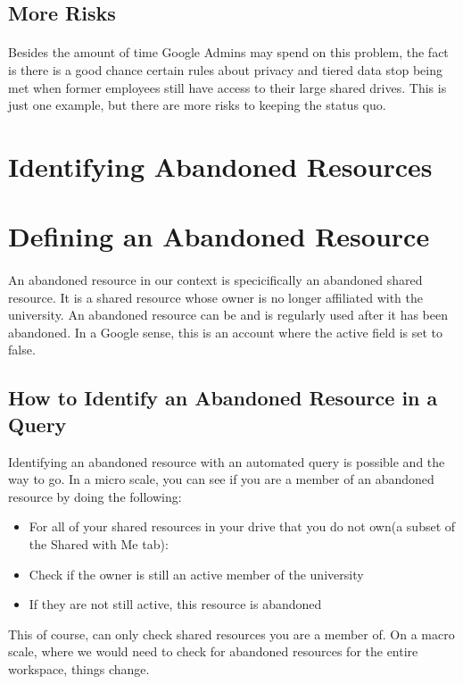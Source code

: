 \documentclass{article}
\begin{document}
\subsection*{More Risks}
\paragraph*{} Besides the amount of time Google Admins may spend on this problem, the fact is there is a good chance certain rules about privacy and tiered data stop being met when former employees still have access to their large shared drives.
This is just one example, but there are more risks to keeping the status quo.

\newpage
\section{Identifying Abandoned Resources}
\section*{Defining an Abandoned Resource}
\paragraph*{} An abandoned resource in our context is specicifically an abandoned shared resource.
It is a shared resource whose owner is no longer affiliated with the university. An abandoned resource can be and is regularly used after it has been abandoned.
In a Google sense, this is an account where the active field is set to false.

\subsection*{How to Identify an Abandoned Resource in a Query}
Identifying an abandoned resource with an automated query is possible and the way to go.
In a micro scale, you can see if you are a member of an abandoned resource by doing the following:
\begin{tcolorbox}
    \begin{itemize}
        \item For all of your shared resources in your drive that you do not own(a subset of the Shared with Me tab):
        \item Check if the owner is still an active member of the university
        \item If they are not still active, this resource is abandoned
    \end{itemize}
\end{tcolorbox}
This of course, can only check shared resources you are a member of.
On a macro scale, where we would need to check for abandoned resources for the entire workspace, things change.
\end{document}
